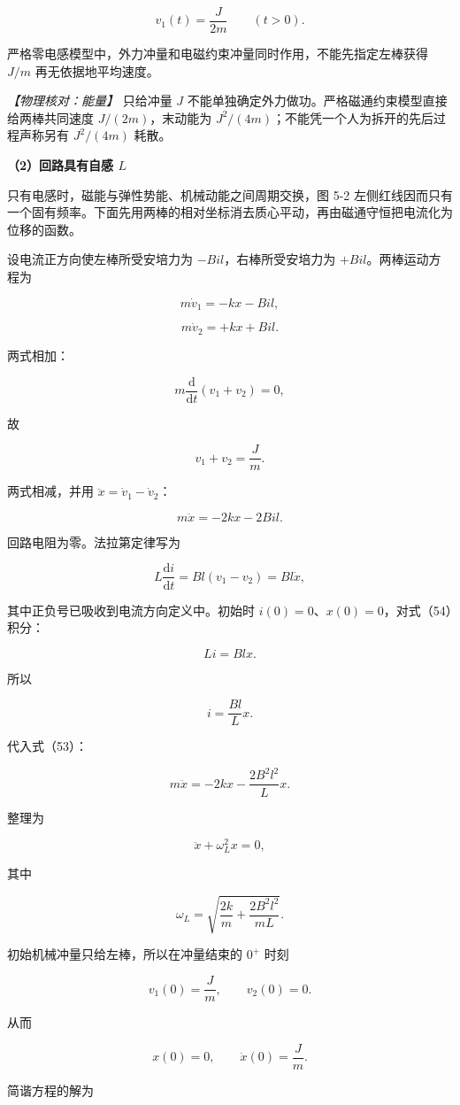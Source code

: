 \documentclass[12pt,a4paper,UTF8]{ctexart}
\begin{document}
\[\boxed{v_1(t)=\frac{J}{2m}\qquad(t>0)}. \tag{49}\]

严格零电感模型中，外力冲量和电磁约束冲量同时作用，不能先指定左棒获得
\(J/m\) 再无依据地平均速度。

\emph{【物理核对：能量】} 只给冲量 \(J\)
不能单独确定外力做功。严格磁通约束模型直接给两棒共同速度
\(J/(2m)\)，末动能为 \(J^2/(4m)\)；不能凭一个人为拆开的先后过程声称另有
\(J^2/(4m)\) 耗散。

\textbf{（2）回路具有自感 \(L\)}

只有电感时，磁能与弹性势能、机械动能之间周期交换，图 5-2
左侧红线因而只有一个固有频率。下面先用两棒的相对坐标消去质心平动，再由磁通守恒把电流化为位移的函数。

设电流正方向使左棒所受安培力为 \(-Bil\)，右棒所受安培力为
\(+Bil\)。两棒运动方程为

\[m\dot v_1=-kx-Bil, \tag{50}\]

\[m\dot v_2=+kx+Bil. \tag{51}\]

两式相加：

\[m\frac{\mathrm d}{\mathrm dt}(v_1+v_2)=0,\]

故

\[v_1+v_2=\frac Jm. \tag{52}\]

两式相减，并用 \(\ddot x=\dot v_1-\dot v_2\)：

\[m\ddot x=-2kx-2Bil. \tag{53}\]

回路电阻为零。法拉第定律写为

\[L\frac{\mathrm di}{\mathrm dt}=Bl(v_1-v_2)=Bl\dot x, \tag{54}\]

其中正负号已吸收到电流方向定义中。初始时
\(i(0)=0\)、\(x(0)=0\)，对式（54）积分：

\[Li=Blx.\]

所以

\[i=\frac{Bl}{L}x. \tag{55}\]

代入式（53）：

\[m\ddot x=-2kx-\frac{2B^2l^2}{L}x.\]

整理为

\[\ddot x+\omega_L^2x=0,\]

其中

\[\omega_L=\sqrt{\frac{2k}{m}+\frac{2B^2l^2}{mL}}. \tag{56}\]

初始机械冲量只给左棒，所以在冲量结束的 \(0^+\) 时刻

\[v_1(0)=\frac Jm,\qquad v_2(0)=0.\]

从而

\[x(0)=0,\qquad \dot x(0)=\frac Jm.\]

简谐方程的解为
\end{document}
